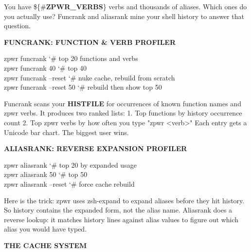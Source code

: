 \documentclass[11pt,a4paper,twoside]{book}
\begin{document}
You have \$\{\#\textbf{ZPWR\_VERBS}\} verbs and thousands of aliases. Which ones do you actually use? Funcrank and aliasrank mine your shell history to answer that question.


\vspace{12pt}
{\bfseries\color{neonyellow} FUNCRANK: FUNCTION \& VERB PROFILER}\vspace{4pt}

\begin{codebox}
\color{neongreen}zpwr funcrank                       {\char`\#} top 20 functions and verbs\\
\color{neongreen}zpwr funcrank 40                    {\char`\#} top 40\\
\color{neongreen}zpwr funcrank --reset               {\char`\#} nuke cache, rebuild from scratch\\
\color{neongreen}zpwr funcrank --reset 50            {\char`\#} rebuild then show top 50\\
\end{codebox}

Funcrank scans your \textbf{HISTFILE} for occurrences of known function names and zpwr verbs. It produces two ranked lists: 1. Top functions by history occurrence count 2. Top zpwr verbs by how often you type "zpwr <verb>" Each entry gets a Unicode bar chart. The biggest user wins.


\vspace{12pt}
{\bfseries\color{neonyellow} ALIASRANK: REVERSE EXPANSION PROFILER}\vspace{4pt}

\begin{codebox}
\color{neongreen}zpwr aliasrank                      {\char`\#} top 20 by expanded usage\\
\color{neongreen}zpwr aliasrank 50                   {\char`\#} top 50\\
\color{neongreen}zpwr aliasrank --reset              {\char`\#} force cache rebuild\\
\end{codebox}

Here is the trick: zpwr uses zsh-expand to expand aliases before they hit history. So history contains the expanded form, not the alias name. Aliasrank does a reverse lookup: it matches history lines against alias values to figure out which alias you would have typed.


\vspace{12pt}
{\bfseries\color{neonyellow} THE CACHE SYSTEM}\vspace{4pt}
\end{document}
